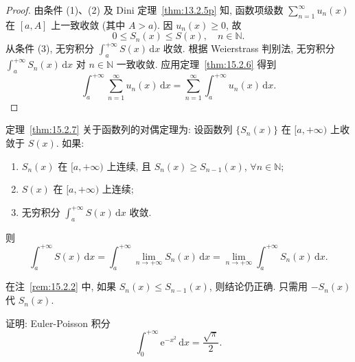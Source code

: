 \begin{proof}
由条件 (1)、(2) 及 Dini 定理~\ref{thm:13.2.5p} 知, 函数项级数 $\displaystyle\sum_{n=1}^{\infty}u_{n}(x)$ 在 $[a,A]$ 上一致收敛 (其中 $A>a$). 因 $u_{n}(x)\geqslant0$, 故
\[
  0\leqslant S_{n}(x)\leqslant S(x),\quad n\in\mathbb{N}.
\]
从条件 (3), 无穷积分 $\displaystyle\int_{a}^{+\infty}S(x)\,\mathrm{d}x$ 收敛. 根据 Weierstrass 判别法, 无穷积分 $\displaystyle\int_{a}^{+\infty}S_{n}(x)\,\mathrm{d}x$ 对 $n\in\mathbb{N}$ 一致收敛. 应用定理~\ref{thm:15.2.6} 得到
\[
  \int_{a}^{+\infty}\sum_{n=1}^{\infty}u_{n}(x)\,\mathrm{d}x=\sum_{n=1}^{\infty}\int_{a}^{+\infty}u_{n}(x)\,\mathrm{d}x.
\]
\end{proof}

\begin{remark}\label{rem:15.2.2}
定理~\ref{thm:15.2.7} 关于函数列的对偶定理为: 设函数列 $\{S_{n}(x)\}$ 在 $[a,+\infty)$ 上收敛于 $S(x)$. 如果:
\begin{enumerate}
  \item $S_{n}(x)$ 在 $[a,+\infty)$ 上连续, 且 $S_{n}(x)\geqslant S_{n-1}(x)$, $\forall n\in\mathbb{N}$;
  \item $S(x)$ 在 $[a,+\infty)$ 上连续;
  \item 无穷积分 $\displaystyle\int_{a}^{+\infty}S(x)\,\mathrm{d}x$ 收敛.
\end{enumerate}
则
\[
  \int_{a}^{+\infty}S(x)\,\mathrm{d}x=\int_{a}^{+\infty}\lim_{n\to+\infty}S_{n}(x)\,\mathrm{d}x=\lim_{n\to+\infty}\int_{a}^{+\infty}S_{n}(x)\,\mathrm{d}x.
\]
\end{remark}

\begin{remark}\label{rem:15.2.3}
在注~\ref{rem:15.2.2} 中, 如果 $S_{n}(x)\leqslant S_{n-1}(x)$, 则结论仍正确. 只需用 $-S_{n}(x)$ 代 $S_{n}(x)$.
\end{remark}

\begin{example}\label{ex:15.2.8}
证明: Euler-Poisson 积分
\[
  \int_{0}^{+\infty}\mathrm{e}^{-x^{2}}\,\mathrm{d}x=\frac{\sqrt{\pi}}{2}.
\]
\end{example}

